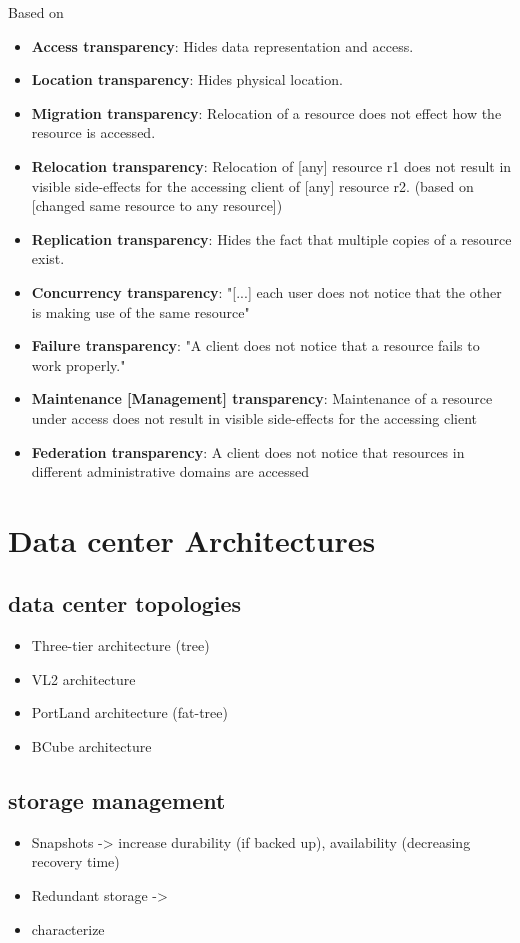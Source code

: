 Based on \cite{Tanenbaum2007, Iso1996}
\begin{itemize}
\item \textbf{Access transparency}: Hides data representation and access.
\item \textbf{Location transparency}: Hides physical location.
\item \textbf{Migration transparency}: Relocation of a resource does not effect how the resource is accessed.
\item \textbf{Relocation transparency}: Relocation of [any] resource r1 does not result in visible side-effects for the accessing client of [any] resource r2. (based on \cite{Tanenbaum2007} [changed same resource to any resource])
\item \textbf{Replication transparency}: Hides the fact that multiple copies of a resource exist.
\item \textbf{Concurrency transparency}: "[...] each user does not notice that the other is making use of the same resource" \cite{Tanenbaum2007}
\item \textbf{Failure transparency}: "A client does not notice that a resource fails to work properly."
\item \textbf{Maintenance [Management] transparency}: Maintenance of a resource under access does not result in visible side-effects for the accessing client
\item \textbf{Federation transparency}: A client does not notice that resources in different administrative domains are accessed
\end{itemize}

\section{Data center Architectures}

\subsection{data center topologies}
\begin{itemize}
\item Three-tier architecture (tree) \cite{Al-Fares2008, Meng2010, Ballani2011, Al-Fares2008}
\item VL2 architecture \cite{Meng2010, Ballani2011, Al-Fares2008}
\item PortLand architecture (fat-tree) \cite{Meng2010, Ballani2011}
\item BCube architecture \cite{Meng2010}
\end{itemize}

\subsection{storage management}
\begin{itemize}
\item Snapshots -> increase durability (if backed up), availability (decreasing recovery time)
\item Redundant storage ->
\item characterize 
\end{itemize}